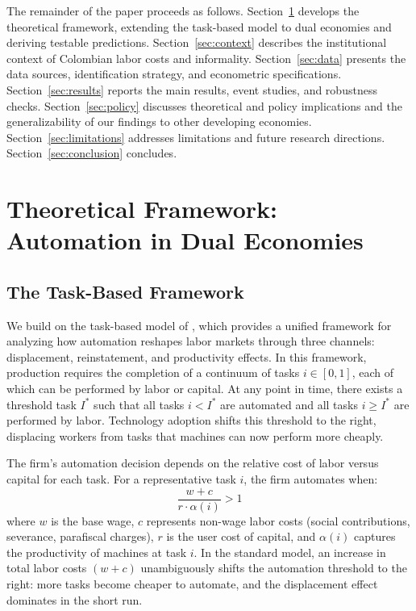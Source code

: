 \documentclass[5p,times,authoryear]{elsarticle}
\begin{document}
The remainder of the paper proceeds as follows. Section~\ref{sec:theory} develops the theoretical framework, extending the task-based model to dual economies and deriving testable predictions. Section~\ref{sec:context} describes the institutional context of Colombian labor costs and informality. Section~\ref{sec:data} presents the data sources, identification strategy, and econometric specifications. Section~\ref{sec:results} reports the main results, event studies, and robustness checks. Section~\ref{sec:policy} discusses theoretical and policy implications and the generalizability of our findings to other developing economies. Section~\ref{sec:limitations} addresses limitations and future research directions. Section~\ref{sec:conclusion} concludes.

\FloatBarrier


\section{Theoretical Framework: Automation in Dual Economies}
\label{sec:theory}

\subsection{The Task-Based Framework}
\label{subsec:task_model}

We build on the task-based model of \citet{acemoglu2019automation}, which provides a unified framework for analyzing how automation reshapes labor markets through three channels: displacement, reinstatement, and productivity effects. In this framework, production requires the completion of a continuum of tasks $i \in [0,1]$, each of which can be performed by labor or capital. At any point in time, there exists a threshold task $I^*$ such that all tasks $i < I^*$ are automated and all tasks $i \geq I^*$ are performed by labor. Technology adoption shifts this threshold to the right, displacing workers from tasks that machines can now perform more cheaply.

The firm's automation decision depends on the relative cost of labor versus capital for each task. For a representative task $i$, the firm automates when:
\begin{equation}
\label{eq:automation_threshold}
\frac{w + c}{r \cdot \alpha(i)} > 1
\end{equation}
where $w$ is the base wage, $c$ represents non-wage labor costs (social contributions, severance, parafiscal charges), $r$ is the user cost of capital, and $\alpha(i)$ captures the productivity of machines at task $i$. In the standard model, an increase in total labor costs $(w + c)$ unambiguously shifts the automation threshold to the right: more tasks become cheaper to automate, and the displacement effect dominates in the short run.
\end{document}
